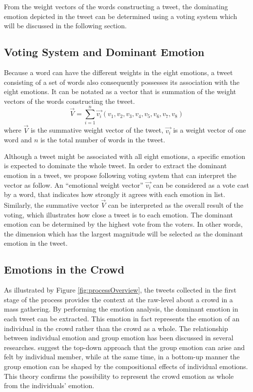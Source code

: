 From the weight vectors of the words constructing a tweet, the dominating emotion depicted in the tweet can be determined using a voting system which will be discussed in the following section.

\subsection{Voting System and Dominant Emotion}
Because a word can have the different weights in the eight emotions, a tweet consisting of a set of words also consequently possesses its association with the eight emotions. It can be notated as a vector that is summation of the weight vectors of the words constructing the tweet.
\[
	\vec{V} = \sum_{i=1}^{n} \vec{v_i}(v_1, v_2, v_3, v_4, v_5, v_6, v_7, v_8)
\]
where \(\vec{V}\) is the summative weight vector of the tweet, \(\vec{v_i}\) is a weight vector of one word and \(n\) is the total number of words in the tweet.

Although a tweet might be associated with all eight emotions, a specific emotion is expected to dominate the whole tweet. In order to extract the dominant emotion in a tweet, we propose following voting system that can interpret the vector as follow. An ``emotional weight vector'' \(\vec{v_i}\) can be considered as a vote cast by a word, that indicates how strongly it agrees with each emotion in list. Similarly, the summative vector \(\vec{V}\) can be interpreted as the overall result of the voting, which illustrates how close a tweet is to each emotion. The dominant emotion can be determined by the highest vote from the voters. In other words, the dimension which has the largest magnitude will be selected as the dominant emotion in the tweet.

\subsection{Emotions in the Crowd}
As illustrated by Figure \ref{fig:processOverview}, the tweets collected in the first stage of the process provides the context at the raw-level about a crowd in a mass gathering. By performing the emotion analysis, the dominant emotion in each tweet can be extracted. This emotion in fact represents the emotion of an individual in the crowd rather than the crowd as a whole. The relationship between individual emotion and group emotion has been discussed in several researches. \citet{barsade1998group} suggest the top-down approach that the group emotion can arise and felt by individual member, while at the same time, in a bottom-up manner the group emotion can be shaped by the compositional effects of individual emotions. This theory confirms the possibility to represent the crowd emotion as whole from the individuals' emotion.

